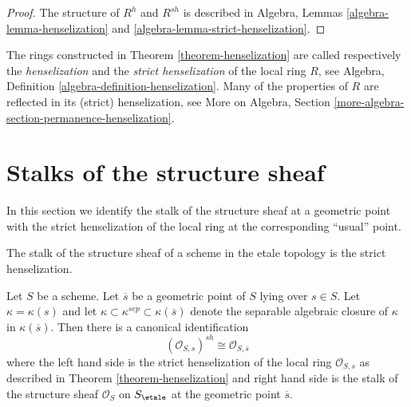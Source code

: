 \begin{proof}
The structure of $R^h$ and $R^{sh}$ is described in
Algebra, Lemmas \ref{algebra-lemma-henselization} and
\ref{algebra-lemma-strict-henselization}.
\end{proof}

\noindent
The rings constructed in Theorem \ref{theorem-henselization}
are called respectively the {\it henselization} and the
{\it strict henselization} of the local ring $R$, see
Algebra, Definition \ref{algebra-definition-henselization}.
Many of the properties of $R$ are reflected in its (strict) henselization,
see More on Algebra,
Section \ref{more-algebra-section-permanence-henselization}.




\section{Stalks of the structure sheaf}
\label{section-stalks-structure-sheaf}

\noindent
In this section we identify the stalk of the structure sheaf at a geometric
point with the strict henselization of the local ring at the corresponding
``usual'' point.

\begin{lemma}
\label{lemma-describe-etale-local-ring}
\begin{slogan}
The stalk of the structure sheaf of a scheme
in the etale topology is the strict henselization.
\end{slogan}
Let $S$ be a scheme.
Let $\overline{s}$ be a geometric point of $S$ lying over $s \in S$.
Let $\kappa = \kappa(s)$ and let
$\kappa \subset \kappa^{sep} \subset \kappa(\overline{s})$ denote
the separable algebraic closure of $\kappa$ in $\kappa(\overline{s})$.
Then there is a canonical identification
$$
(\mathcal{O}_{S, s})^{sh}
\cong
\mathcal{O}_{S, \overline{s}}
$$
where the left hand side is the strict henselization of the local ring
$\mathcal{O}_{S, s}$ as described in
Theorem \ref{theorem-henselization}
and right hand side is the stalk of the structure sheaf
$\mathcal{O}_S$ on $S_\etale$ at
the geometric point $\overline{s}$.
\end{lemma}

